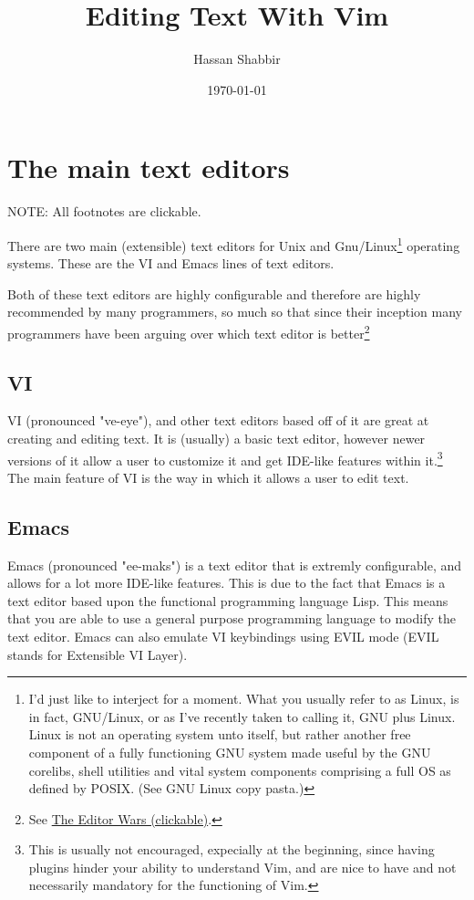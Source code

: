 \documentclass[11pt]{article}
\author{Hassan Shabbir}
\date{\today}
\title{Editing Text With Vim}
\begin{document}
\maketitle
\tableofcontents

\newpage
\section{The main text editors}
\label{sec:org42c88b4}
NOTE: All footnotes are clickable.

There are two main (extensible) text editors for Unix and Gnu/Linux\footnote{I'd just like to interject for a moment. What you usually refer to as Linux, is
in fact, GNU/Linux, or as I've recently taken to calling it, GNU plus Linux.
Linux is not an operating system unto itself, but rather another free component
of a fully functioning GNU system made useful by the GNU corelibs, shell
utilities and vital system components comprising a full OS as defined by POSIX.
(See GNU Linux copy pasta.)}
operating systems. These are the VI and Emacs lines of text editors.

Both of these text editors are highly configurable and therefore are highly
recommended by many programmers, so much so that since their inception many
programmers have been arguing over which text editor is better\footnote{See \href{https://en.wikipedia.org/wiki/Editor\_war}{The Editor Wars (clickable)}.}
\subsection{VI}
\label{sec:orgddb32eb}
VI (pronounced "ve-eye"), and other text editors based off of it are great at
creating and editing text. It is (usually) a basic text editor, however newer
versions of it allow a user to customize it and get IDE-like features within
it.\footnote{This is usually not encouraged, expecially at the beginning, since
having plugins hinder your ability to understand Vim, and are nice to have
and not necessarily mandatory for the functioning of Vim.} The main feature of VI is the way in which it allows a user to edit
text.
\subsection{Emacs}
\label{sec:org56c488f}
Emacs (pronounced "ee-maks") is a text editor that is extremly configurable, and
allows for a lot more IDE-like features. This is due to the fact that Emacs is a
text editor based upon the functional programming language Lisp. This means that
you are able to use a general purpose programming language to modify the text
editor. Emacs can also emulate VI keybindings using EVIL mode (EVIL stands for
Extensible VI Layer).
\end{document}
